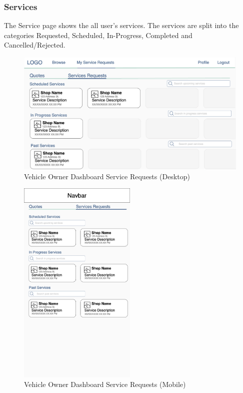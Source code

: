 \documentclass[12pt, titlepage]{article}
\begin{document}
\subsubsection{Services}
The Service page shows the all user's services. The services are split into the categories
Requested, Scheduled, In-Progress, Completed and Cancelled/Rejected.

\begin{figure}[H]
	\centering
	\includegraphics[width=\textwidth]{mockups/Vehicle Owner Dashboard (Service Requests) (Desktop).png}
	\caption{Vehicle Owner Dashboard \textemdash{} Service Requests (Desktop)}
\end{figure}

\begin{figure}[H]
	\centering
	\includegraphics[width=0.5\textwidth]{mockups/Vehicle Owner Dashboard (Service Requests) (Mobile).png}
	\caption{Vehicle Owner Dashboard \textemdash{} Service Requests (Mobile)}
\end{figure}
\end{document}
